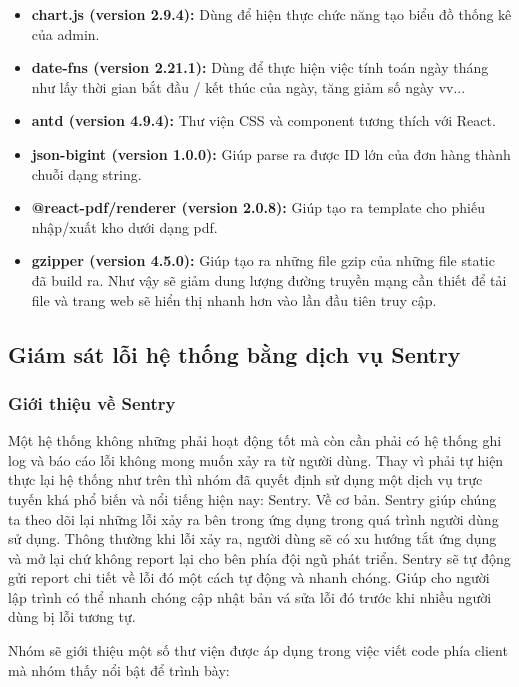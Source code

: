 			\begin{itemize}
				\item \textbf{chart.js (version 2.9.4):} Dùng để hiện thực chức năng tạo biểu đồ thống kê của admin.
				\item \textbf{date-fns (version 2.21.1):} Dùng để thực hiện việc tính toán ngày tháng như lấy thời gian bắt đầu / kết thúc của ngày, tăng giảm số ngày vv...
				\item \textbf{antd (version 4.9.4):} Thư viện CSS và component tương thích với React.
				\item \textbf{json-bigint (version 1.0.0):} Giúp parse ra được ID lớn của đơn hàng thành chuỗi dạng string.
				\item \textbf{@react-pdf/renderer (version 2.0.8):} Giúp tạo ra template cho phiếu nhập/xuất kho dưới dạng pdf.
				\item \textbf{gzipper (version 4.5.0):} Giúp tạo ra những file gzip của những file static đã build ra. Như vậy sẽ giảm dung lượng đường truyền mạng cần thiết để tải file và trang web sẽ hiển thị nhanh hơn vào lần đầu tiên truy cập.
			\end{itemize}
			
	
		\subsection{Giám sát lỗi hệ thống bằng dịch vụ Sentry}
			\subsubsection{Giới thiệu về Sentry}
				Một hệ thống không những phải hoạt động tốt mà còn cần phải có hệ thống ghi log và báo cáo lỗi không mong muốn xảy ra từ người dùng. Thay vì phải tự hiện thực lại hệ thống như trên thì nhóm đã quyết định sử dụng một dịch vụ trực tuyến khá phổ biến và nổi tiếng hiện nay: Sentry. Về cơ bản. Sentry giúp chúng ta theo dõi lại những lỗi xảy ra bên trong ứng dụng trong quá trình người dùng sử dụng. Thông thường khi lỗi xảy ra, người dùng sẽ có xu hướng tắt ứng dụng và mở lại chứ không report lại cho bên phía đội ngũ phát triển. Sentry sẽ tự động gửi report chi tiết về lỗi đó một cách tự động và nhanh chóng. Giúp cho người lập trình có thể nhanh chóng cập nhật bản vá sửa lỗi đó trước khi nhiều người dùng bị lỗi tương tự.
				
				Nhóm sẽ giới thiệu một số thư viện được áp dụng trong việc viết code phía client mà nhóm thấy nổi bật để trình bày:\\
				
